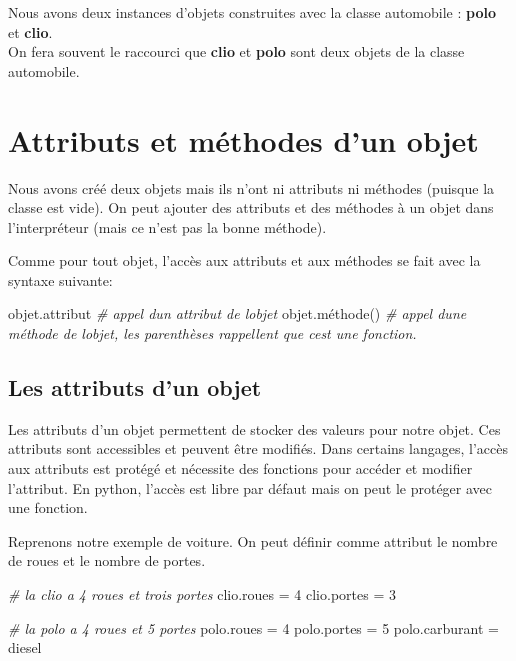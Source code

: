 \documentclass[11pt]{article}
\newenvironment{Shaded}{}{}
\newcommand{\DecValTok}[1]{\textcolor[rgb]{0.25,0.63,0.44}{{#1}}}
\newcommand{\CommentTok}[1]{\textcolor[rgb]{0.38,0.63,0.69}{\textit{{#1}}}}
\newcommand{\NormalTok}[1]{{#1}}
\newcommand{\OperatorTok}[1]{\textcolor[rgb]{0.40,0.40,0.40}{{#1}}}
\begin{document}
Nous avons deux instances d'objets construites avec la classe automobile
: \textbf{polo} et \textbf{clio}.\\
On fera souvent le raccourci que \textbf{clio} et \textbf{polo} sont
deux objets de la classe automobile.

    \hypertarget{attributs-et-muxe9thodes-dun-objet}{%
\section{Attributs et méthodes d'un
objet}\label{attributs-et-muxe9thodes-dun-objet}}

Nous avons créé deux objets mais ils n'ont ni attributs ni méthodes
(puisque la classe est vide). On peut ajouter des attributs et des
méthodes à un objet dans l'interpréteur (mais ce n'est pas la bonne
méthode).

Comme pour tout objet, l'accès aux attributs et aux méthodes se fait
avec la syntaxe suivante:

\begin{Shaded}
\begin{Highlighting}[]
\NormalTok{objet.attribut }\CommentTok{\# appel d\textquotesingle{}un attribut de l\textquotesingle{}objet}
\NormalTok{objet.méthode() }\CommentTok{\# appel d\textquotesingle{}une méthode de l\textquotesingle{}objet, les parenthèses rappellent que c\textquotesingle{}est une fonction.}
\end{Highlighting}
\end{Shaded}

\hypertarget{les-attributs-dun-objet}{%
\subsection{Les attributs d'un objet}\label{les-attributs-dun-objet}}

Les attributs d'un objet permettent de stocker des valeurs pour notre
objet. Ces attributs sont accessibles et peuvent être modifiés. Dans
certains langages, l'accès aux attributs est protégé et nécessite des
fonctions pour accéder et modifier l'attribut. En python, l'accès est
libre par défaut mais on peut le protéger avec une fonction.

Reprenons notre exemple de voiture. On peut définir comme attribut le
nombre de roues et le nombre de portes.

\begin{Shaded}
\begin{Highlighting}[]
\CommentTok{\# la clio a 4 roues et trois portes}
\NormalTok{clio.roues }\OperatorTok{=} \DecValTok{4}
\NormalTok{clio.portes }\OperatorTok{=} \DecValTok{3}

\CommentTok{\# la polo a 4 roues et 5 portes}
\NormalTok{polo.roues }\OperatorTok{=} \DecValTok{4}
\NormalTok{polo.portes }\OperatorTok{=} \DecValTok{5}
\NormalTok{polo.carburant }\OperatorTok{=}\NormalTok{ diesel}
\end{Highlighting}
\end{Shaded}
\end{document}
